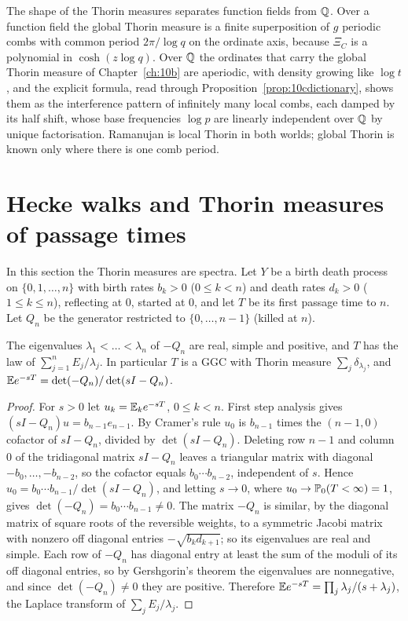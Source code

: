 The shape of the Thorin measures separates function fields from $\mathbb{Q}$. Over a function field the global Thorin measure is a finite superposition of $g$ periodic combs with common period $2\pi/\log q$ on the ordinate axis, because $\Xi_C$ is a polynomial in $\cosh(z\log q)$. Over $\mathbb{Q}$ the ordinates that carry the global Thorin measure of Chapter~\ref{ch:10b} are aperiodic, with density growing like $\log t$, and the explicit formula, read through Proposition~\ref{prop:10cdictionary}, shows them as the interference pattern of infinitely many local combs, each damped by its half shift, whose base frequencies $\log p$ are linearly independent over $\mathbb{Q}$ by unique factorisation. Ramanujan is local Thorin in both worlds; global Thorin is known only where there is one comb period.

\section{Hecke walks and Thorin measures of passage times}

In this section the Thorin measures are spectra. Let $Y$ be a birth death process on $\{0,1,\dots,n\}$ with birth rates $b_k>0$ ($0\le k<n$) and death rates $d_k>0$ ($1\le k\le n$), reflecting at $0$, started at $0$, and let $T$ be its first passage time to $n$. Let $Q_n$ be the generator restricted to $\{0,\dots,n-1\}$ (killed at $n$).

\begin{theorem}\label{thm:10ckeilson}
The eigenvalues $\lambda_1<\dots<\lambda_n$ of $-Q_n$ are real, simple and positive, and $T$ has the law of $\sum_{j=1}^nE_j/\lambda_j$. In particular $T$ is a GGC with Thorin measure $\sum_j\delta_{\lambda_j}$, and $\mathbb{E} e^{-sT}=\det(-Q_n)/\det(sI-Q_n)$.
\end{theorem}

\begin{proof}
For $s>0$ let $u_k=\mathbb{E}_ke^{-sT}$, $0\le k<n$. First step analysis gives $(sI-Q_n)u=b_{n-1}e_{n-1}$. By Cramer's rule $u_0$ is $b_{n-1}$ times the $(n-1,0)$ cofactor of $sI-Q_n$, divided by $\det(sI-Q_n)$. Deleting row $n-1$ and column $0$ of the tridiagonal matrix $sI-Q_n$ leaves a triangular matrix with diagonal $-b_0,\dots,-b_{n-2}$, so the cofactor equals $b_0\cdots b_{n-2}$, independent of $s$. Hence $u_0=b_0\cdots b_{n-1}/\det(sI-Q_n)$, and letting $s\to0$, where $u_0\to\mathbb{P}_0(T<\infty)=1$, gives $\det(-Q_n)=b_0\cdots b_{n-1}\ne0$. The matrix $-Q_n$ is similar, by the diagonal matrix of square roots of the reversible weights, to a symmetric Jacobi matrix with nonzero off diagonal entries $-\sqrt{b_kd_{k+1}}$; so its eigenvalues are real and simple. Each row of $-Q_n$ has diagonal entry at least the sum of the moduli of its off diagonal entries, so by Gershgorin's theorem the eigenvalues are nonnegative, and since $\det(-Q_n)\ne0$ they are positive. Therefore $\mathbb{E} e^{-sT}=\prod_j\lambda_j/(s+\lambda_j)$, the Laplace transform of $\sum_jE_j/\lambda_j$.
\end{proof}

